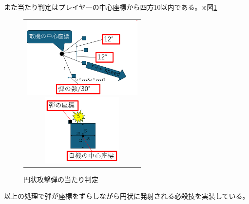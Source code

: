 \documentclass[a4paper,titlepage,11pt]{ltjsarticle}
\begin{document}
また当たり判定はプレイヤーの中心座標から四方10以内である。※図\ref{cb_attack}
\begin{figure}[H]
\begin{center}
\begin{tabular}{c}
\begin{minipage}{0.5\hsize}
\begin{center}
\includegraphics[width=6cm]{Cparts.png}
\end{center}
\caption{円状攻撃弾の発射原理}
\label{Cparts}
\end{minipage}
\begin{minipage}{0.5\hsize}
\begin{center}
\includegraphics[width=4cm]{cb_attack.png}
\end{center}
\caption{円状攻撃弾の当たり判定}
\label{cb_attack}
\end{minipage}
\end{tabular}
\end{center}
\end{figure}
以上の処理で弾が座標をずらしながら円状に発射される必殺技を実装している。
\end{document}
